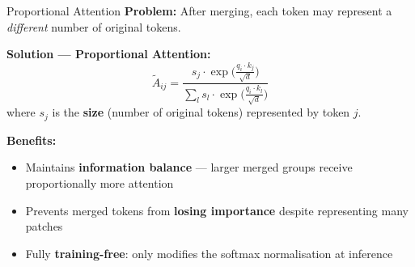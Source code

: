 \documentclass[aspectratio=169, 11pt]{beamer}
\begin{document}
\begin{frame}{Proportional Attention}
\textbf{Problem:} After merging, each token may represent a \emph{different} number of original tokens.

\vspace{0.3cm}
\textbf{Solution — Proportional Attention:}
\[
  \widetilde{A}_{ij}
  = \frac{s_j \cdot \exp\!\bigl(\tfrac{q_i \cdot k_j}{\sqrt{d}}\bigr)}
         {\sum_{l} s_l \cdot \exp\!\bigl(\tfrac{q_i \cdot k_l}{\sqrt{d}}\bigr)}
\]
where $s_j$ is the \textbf{size} (number of original tokens) represented by token $j$.

\vspace{0.3cm}
\textbf{Benefits:}
\begin{itemize}
  \item Maintains \textbf{information balance} — larger merged groups receive proportionally more attention
  \item Prevents merged tokens from \textbf{losing importance} despite representing many patches
  \item Fully \textbf{training-free}: only modifies the softmax normalisation at inference
\end{itemize}
\end{frame}
\end{document}
